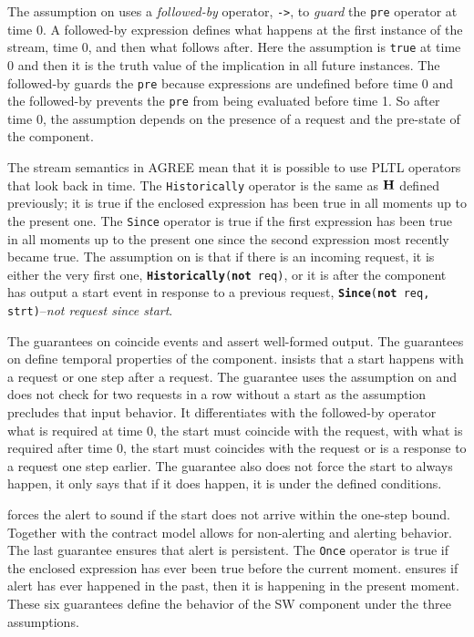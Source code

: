 The assumption on  uses a \emph{followed-by} operator, \texttt{->}, to \emph{guard} the \texttt{pre} operator at time 0.
A followed-by expression defines what happens at the first instance of the stream, time 0, and then what follows after. 
Here the assumption is \texttt{true} at time 0 and then it is the truth value of the implication in all future instances.
The followed-by guards the \texttt{pre} because expressions are undefined before time 0 and the followed-by prevents the \texttt{pre} from being evaluated before time 1.
So after time 0, the assumption depends on the presence of a request and the pre-state of the component.

The stream semantics in AGREE mean that it is possible to use PLTL operators that look back in time.
The \texttt{Historically} operator is the same as $\mathbf{H}$ defined previously; it is true if the enclosed expression has been true in all moments up to the present one. 
The \texttt{Since} operator is true if the first expression has been true in all moments up to the present one since the second expression most recently became true.
The assumption on  is that if there is an incoming request, it is either the very first one, \texttt{\textbf{Historically}(\textbf{not} req)}, or it is after the component has output a start event in response to a previous request, \texttt{\textbf{Since}(\textbf{not} req, strt)}--\emph{not request since start}.

The guarantees on  coincide events and assert well-formed output.
The guarantees on  define temporal properties of the component.
 insists that a start happens with a request or one step after a request.
The guarantee uses the assumption on  and does not check for two requests in a row without a start as the assumption precludes that input behavior.
It differentiates with the followed-by operator what is required at time 0, the start must coincide with the request, with what is required after time 0, the start must coincides with the request or is a response to a request one step earlier.
The guarantee also does not force the start to always happen, it only says that if it does happen, it is under the defined conditions.

 forces the alert to sound if the start does not arrive within the one-step bound.
Together with  the contract model allows for non-alerting and alerting behavior.
The last guarantee ensures that alert is persistent.
The \texttt{Once} operator is true if the enclosed expression has ever been true before the current moment.
 ensures if alert has ever happened in the past, then it is happening in the present moment.
These six guarantees define the behavior of the SW component under the three assumptions.
